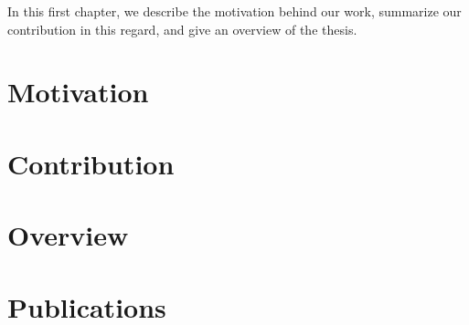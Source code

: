 In this first chapter, we describe the motivation behind our work, summarize our
contribution in this regard, and give an overview of the thesis.

\section{Motivation}

\section{Contribution}

\section{Overview}

\section{Publications}
